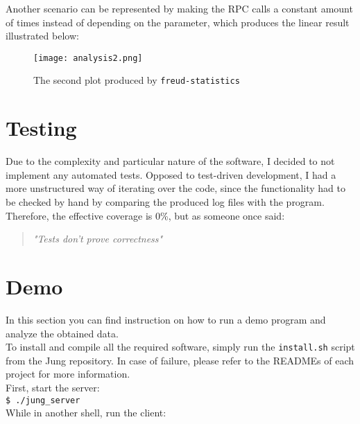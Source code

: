     Another scenario can be represented by making the RPC calls a constant amount of times instead
    of depending on the parameter, which produces the linear result illustrated below:\\

    \begin{figure}[H]
        \centering
        \texttt{[image: analysis2.png]}
        \caption{The second plot produced by \texttt{freud-statistics}}
        \label{fig:analysis2}
    \end{figure}


    \section{Testing}

        Due to the complexity and particular nature of the software, I decided to not implement any automated
        tests. Opposed to test-driven development, I had a more unstructured way of iterating over the code,
        since the functionality had to be checked by hand by comparing the produced log files with the program.
        Therefore, the effective coverage is 0\%, but as someone once said:\\

        \begin{quote} 
            \centering 
            \textit{"Tests don't prove correctness"}
        \end{quote}


    \section{Demo}

        In this section you can find instruction on how to run a demo program and analyze the obtained data.\\

        To install and compile all the required software, simply run the \texttt{install.sh} script from the Jung repository.
        In case of failure, please refer to the READMEs of each project for more information.\\

        First, start the server:\\

        \texttt{\$ ./jung\_server}\\
        
        While in another shell, run the client:\\
        
